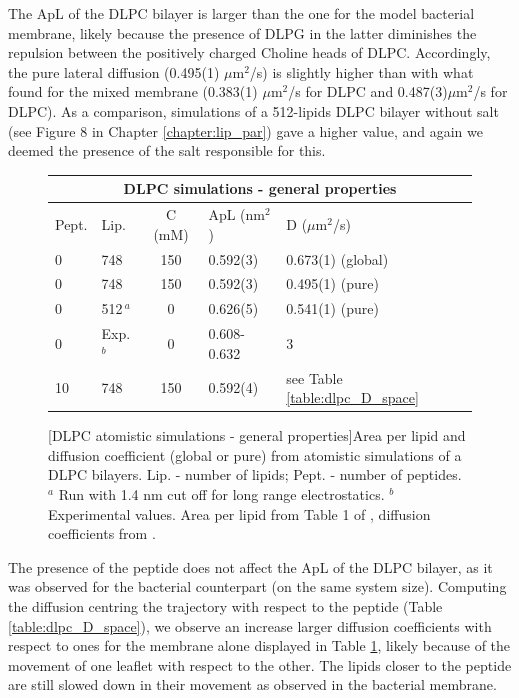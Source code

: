The ApL of the DLPC bilayer is larger than the one for the model bacterial membrane, likely because the presence of DLPG in the latter diminishes the repulsion between the positively charged Choline heads of DLPC. Accordingly, the pure lateral diffusion (0.495(1) $\mu$m$^2$/s) is slightly higher than with what found for the mixed membrane (0.383(1) $\mu$m$^2$/s for DLPC and 0.487(3)$\mu$m$^2$/s for DLPC). As a comparison, simulations of a 512-lipids DLPC bilayer without salt (see Figure 8 in Chapter \ref{chapter:lip_par}) gave a higher value, and again we deemed the presence of the salt responsible for this.

\begin{figure}[t!]
\centering
 \def\arraystretch{1.6}
\begin{tabular}{llcll}
\multicolumn{5}{c}{\textbf{DLPC simulations - general properties}} \\
\hline
Pept. & Lip. & C (mM) & ApL (nm$^2$) & D ($\mu$m$^2$/s) \\
\hline
0 & 748 & 150 & 0.592(3) & 0.673(1) (global) \\
0 & 748 & 150 & 0.592(3) & 0.495(1) (pure) \\
0 & 512$\,^a$ & 0 & 0.626(5) & 0.541(1) (pure) \\
\cline{2-5}
0 & Exp.$^b$ & 0 & 0.608-0.632 & 3 \\
\hline
10 & 748 & 150 & 0.592(4) & see Table \ref{table:dlpc_D_space} \\
\hline
 \end{tabular}
[DLPC atomistic simulations - general properties]{Area per lipid and diffusion coefficient (global or pure) from atomistic simulations of a DLPC bilayers. Lip. - number of lipids; Pept. - number of peptides. $^a$ Run with 1.4 nm cut off for long range electrostatics. $^b$ Experimental values. Area per lipid from Table 1 of \citet{Poger2016}, diffusion coefficients from \citet{Lindblom2009}.}
\label{table:dlpc_apl}
\end{figure}

The presence of the peptide does not affect the ApL of the DLPC bilayer, as it was observed for the bacterial counterpart (on the same system size). Computing the diffusion centring the trajectory with respect to the peptide (Table \ref{table:dlpc_D_space}), we observe an increase larger diffusion coefficients with respect to ones for the membrane alone displayed in Table \ref{table:dlpc_apl}, likely because of the movement of one leaflet with respect to the other. The lipids closer to the peptide are still slowed down in their movement as observed in the bacterial membrane.


